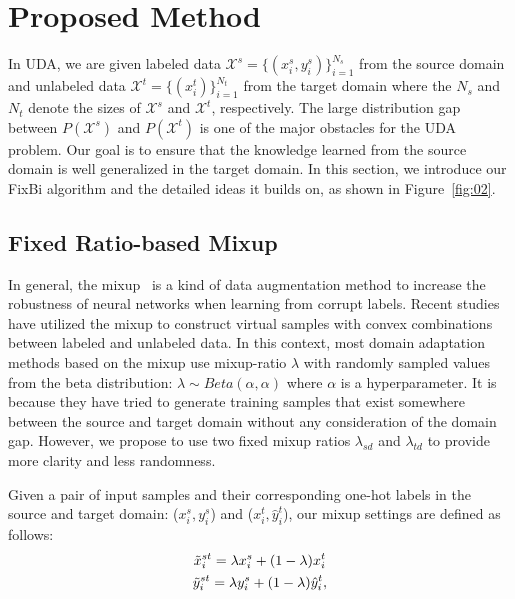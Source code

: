 \documentclass[final]{cvpr}
\begin{document}
\section{Proposed Method}
In UDA, we are given labeled data $\mathcal{X}^s = \{({x}^{s}_i, {y}^{s}_i)\}^{N_s}_{i=1}$ from the source domain and unlabeled data $\mathcal{X}^t = \{({x}^{t}_i)\}^{N_t}_{i=1}$ from the target domain where the $N_{s}$ and $N_{t}$ denote the sizes of $\mathcal{X}^s$ and $\mathcal{X}^t$, respectively. The large distribution gap between $P(\mathcal{X}^s)$ and $P(\mathcal{X}^t)$ is one of the major obstacles for the UDA problem. Our goal is to ensure that the knowledge learned from the source domain is well generalized in the target domain. In this section, we introduce our FixBi algorithm and the detailed ideas it builds on, as shown in Figure~\ref{fig:02}. 

\subsection{Fixed Ratio-based Mixup}
In general, the mixup~\cite{MixUp} is a kind of data augmentation method to increase the robustness of neural networks when learning from corrupt labels. Recent studies \cite{MixMatch, FixMatch} have utilized the mixup to construct virtual samples with convex combinations between labeled and unlabeled data. In this context, most domain adaptation methods \cite{VMT, Minghao2020, MiCo2020, Wu2020} based on the mixup use mixup-ratio $\lambda$ with randomly sampled values from the beta distribution: $\lambda \sim Beta(\alpha, \alpha)$ where $\alpha$ is a hyperparameter.
It is because they have tried to generate training samples that exist somewhere between the source and target domain without any consideration of the domain gap. However, we propose to use two fixed mixup ratios $\lambda_{sd}$ and $\lambda_{td}$ to provide more clarity and less randomness.

Given a pair of input samples and their corresponding one-hot labels in the source and target domain: ($x^s_i, y^s_i$) and ($x^t_i, \hat{y}^{t}_i$), our mixup settings are defined as follows:
\begin{equation}
\begin{gathered}
    \Tilde{x}^{st}_i = \lambda {x}^{s}_i +(1-\lambda) {x}^{t}_i \\
    \Tilde{y}^{st}_i = \lambda {y}^{s}_i +(1-\lambda) \hat{y}^{t}_i,
\end{gathered}
\end{equation}
\end{document}
